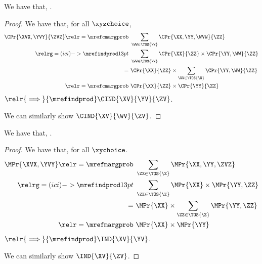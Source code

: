 \begin{proposition}
  We have that, \inddecompdefa.%
\end{proposition}

\begin{proof}
  We have that, for all $\xyzchoice$,
  \begin{align*}
    \CPr{\XVX, \YVY}{\ZVZ} \relr = {\mrefcmargprob}  &\ \sum_{\WW \in \TOS{\W}}\CPr{\XX,\YY,\WVW}{\ZZ}\\
    \relrg = {(ici)->\mrefindprod} 13pt &\ \sum_{\WW \in \TOS{\W}}\CPr{\XX}{\ZZ}\times\CPr{\YY,\WW}{\ZZ}\\
    = &\ \CPr{\XX}{\ZZ}\times\sum_{\WW \in \TOS{\W}}\CPr{\YY,\WW}{\ZZ}\\
    \relr = {\mrefcmargprob} &\ \CPr{\XX}{\ZZ}\times\CPr{\YY}{\ZZ}
  \end{align*}
  $\relr {\implies} {\mrefindprod} \CIND{\XV}{\YV}{\ZV}$.

  We can similarly show $\CIND{\XV}{\WV}{\ZV}$.
\end{proof}

\begin{proposition}
  We have that, \inddecompdefb.%
\end{proposition}

\begin{proof}
  We have that, for all $\xychoice$.
  \begin{align*}
    \MPr{\XVX, \YVY} \relr = {\mrefmargprob}  &\ \sum_{\ZZ \in \TOS{\Z}}\MPr{\XX,\YY,\ZVZ}\\
    \relrg = {(ici)->\mrefindprod} 13pt &\ \sum_{\ZZ \in \TOS{\Z}}\MPr{\XX}\times\MPr{\YY,\ZZ}\\
    = &\ \MPr{\XX}\times\sum_{\ZZ \in \TOS{\Z}}\MPr{\YY,\ZZ}\\
    \relr = {\mrefmargprob} &\ \MPr{\XX}\times\MPr{\YY}
  \end{align*}
  $\relr {\implies} {\mrefindprod} \IND{\XV}{\YV}$.

  We can similarly show $\IND{\XV}{\ZV}$.
\end{proof}
